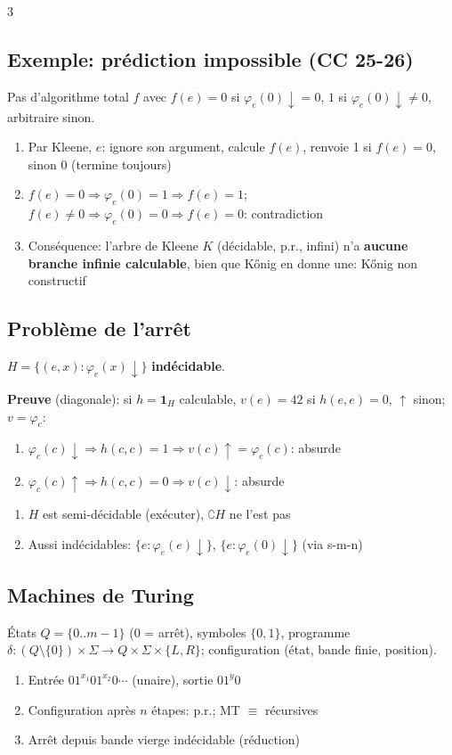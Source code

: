 \documentclass[12pt, a4paper]{article}
\newcommand{\dv}{{\downarrow}}
\newcommand{\uv}{{\uparrow}}
\newcommand{\ff}{\varphi}
\providecommand{\ind}{\mathbf{1}}
\begin{document}
\begin{multicols*}{3}
	\subsection{Exemple: prédiction impossible (CC 25-26)}
	Pas d'algorithme total $f$ avec $f(e)=0$ si $\ff_e(0)\dv=0$, $1$ si $\ff_e(0)\dv\neq0$, arbitraire sinon.
	\begin{enumerate}[\roman*.]
		\item Par Kleene, $e$: ignore son argument, calcule $f(e)$, renvoie 1 si $f(e)=0$, sinon 0 (termine toujours)
		\item $f(e)=0\Rightarrow\ff_e(0)=1\Rightarrow f(e)=1$; $f(e)\neq0\Rightarrow\ff_e(0)=0\Rightarrow f(e)=0$: contradiction
		\item Conséquence: l'arbre de Kleene $K$ (décidable, p.r., infini) n'a \textbf{aucune branche infinie calculable}, bien que Kőnig en donne une: Kőnig non constructif
	\end{enumerate}

	\colbreak
	\subsection{Problème de l'arrêt}
	$H=\{(e,x):\ff_e(x)\dv\}$ \textbf{indécidable}.

	\textbf{Preuve} (diagonale): si $h=\ind_H$ calculable, $v(e)=42$ si $h(e,e)=0$, $\uv$ sinon; $v=\ff_c$:
	\begin{enumerate}[\roman*.]
		\item $\ff_c(c)\dv\Rightarrow h(c,c)=1\Rightarrow v(c)\uv=\ff_c(c)$: absurde
		\item $\ff_c(c)\uv\Rightarrow h(c,c)=0\Rightarrow v(c)\dv$: absurde
	\end{enumerate}
	\begin{enumerate}[\roman*.]
		\item $H$ est semi-décidable (exécuter), $\complement H$ ne l'est pas
		\item Aussi indécidables: $\{e:\ff_e(e)\dv\}$, $\{e:\ff_e(0)\dv\}$ (via s-m-n)
	\end{enumerate}

	\subsection{Machines de Turing}
	États $Q=\{0..m-1\}$ (0 = arrêt), symboles $\{0,1\}$, programme $\delta:(Q\setminus\{0\})\times\Sigma\to Q\times\Sigma\times\{L,R\}$; configuration (état, bande finie, position).
	\begin{enumerate}[\roman*.]
		\item Entrée $01^{x_1}01^{x_2}0\cdots$ (unaire), sortie $01^y0$
		\item Configuration après $n$ étapes: p.r.; MT $\equiv$ récursives
		\item Arrêt depuis bande vierge indécidable (réduction)
	\end{enumerate}


\end{multicols*}
\end{document}
